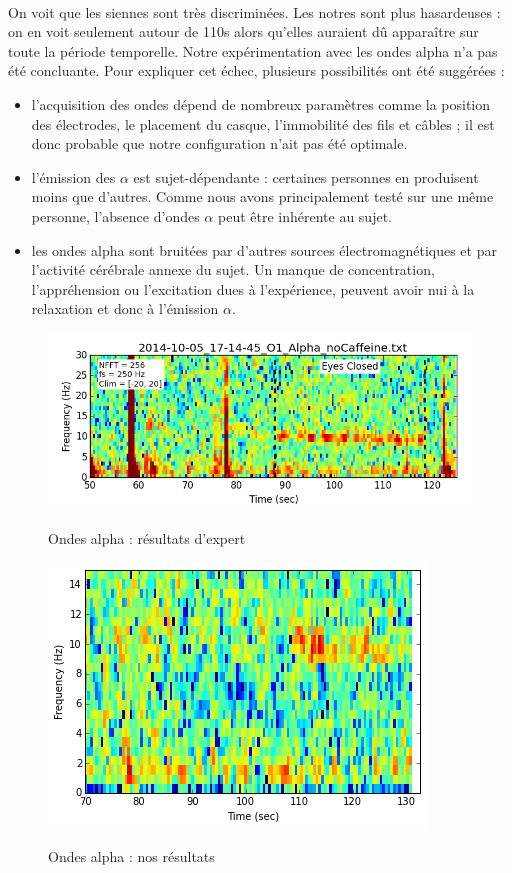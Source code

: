 \documentclass[11pt,a4paper]{article}
\theoremstyle{plain}
\theoremstyle{definition}
\begin{document}
\paragraph{} On voit que les siennes sont très discriminées. Les notres sont plus hasardeuses : on en voit seulement autour de 110s alors qu'elles auraient dû apparaître sur toute la période temporelle. Notre expérimentation avec les ondes alpha n'a pas été concluante. Pour expliquer cet échec, plusieurs possibilités ont été suggérées :
\begin{itemize}
	\item l'acquisition des ondes dépend de nombreux paramètres comme la position des électrodes, le placement du casque, l'immobilité des fils et câbles ; il est donc probable que notre configuration n'ait pas été optimale.
	\item l'émission des $\alpha$ est sujet-dépendante : certaines personnes en produisent moins que d'autres. Comme nous avons principalement testé sur une même personne, l'absence d'ondes $\alpha$ peut être inhérente au sujet.
	\item les ondes alpha sont bruitées par d'autres sources électromagnétiques et par l'activité cérébrale annexe du sujet. Un manque de concentration, l'appréhension ou l'excitation dues à l'expérience, peuvent avoir nui à la relaxation et donc à l'émission $\alpha$.
\end{itemize}

\begin{figure}[h!]
\centering
\caption{Ondes alpha : résultats d'expert}
\includegraphics[scale=0.5]{images/eeghackerAlpha.png}
\label{eeghack}%
\end{figure}
\begin{figure}[h!]
\centering
\caption{Ondes alpha : nos résultats}
\includegraphics[scale=0.5]{images/ourAlpha.png}
\label{ouralph}%
\end{figure}
\end{document}
